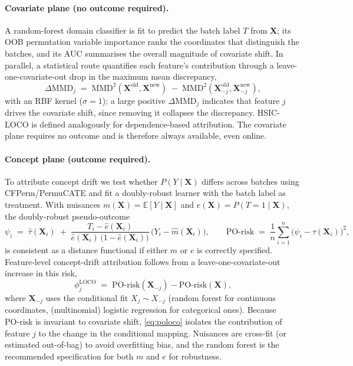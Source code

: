 \documentclass[11pt]{article}
\newcommand{\X}{\mathbf{X}}
\newcommand{\POrisk}{\mathrm{PO\text{-}risk}}
\newcommand{\MMD}{\mathrm{MMD}}
\newcommand{\Exp}{\mathbb{E}}
\begin{document}
\paragraph{Covariate plane (no outcome required).} A random-forest domain
classifier is fit to predict the batch label $T$ from $\X$; its OOB permutation
variable importance ranks the coordinates that distinguish the batches, and its
AUC summarises the overall magnitude of covariate shift. In parallel, a
statistical route quantifies each feature's contribution through a
leave-one-covariate-out drop in the maximum mean discrepancy,
\begin{equation}
  \Delta\MMD_j \;=\; \MMD^2(\X^{\mathrm{old}},\X^{\mathrm{new}})
  \;-\; \MMD^2(\X^{\mathrm{old}}_{-j},\X^{\mathrm{new}}_{-j}),
  \label{eq:mmdloco}
\end{equation}
with an RBF kernel ($\sigma=1$); a large positive $\Delta\MMD_j$ indicates that
feature $j$ drives the covariate shift, since removing it collapses the
discrepancy. HSIC-LOCO is defined analogously for dependence-based attribution.
The covariate plane requires no outcome and is therefore always available, even
online.

\paragraph{Concept plane (outcome required).} To attribute concept drift we test
whether $P(Y\mid\X)$ differs across batches using CFPerm/PermuCATE and fit a
doubly-robust learner with the batch label as treatment. With nuisances
$m(\X)=\Exp[Y\mid\X]$ and $e(\X)=P(T=1\mid\X)$, the doubly-robust pseudo-outcome
\begin{equation}
  \psi_i \;=\; \hat\tau(\X_i)
  \;+\; \frac{T_i-\hat e(\X_i)}{\hat e(\X_i)\,\bigl(1-\hat e(\X_i)\bigr)}\,
  \bigl(Y_i-\hat m(\X_i)\bigr),
  \qquad
  \POrisk \;=\; \frac{1}{n}\sum_{i=1}^{n}\bigl(\psi_i-\hat\tau(\X_i)\bigr)^2,
  \label{eq:porisk}
\end{equation}
is consistent as a distance functional if either $m$ or $e$ is correctly
specified. Feature-level concept-drift attribution follows from a
leave-one-covariate-out increase in this risk,
\begin{equation}
  \phi_j^{\mathrm{LOCO}} \;=\; \POrisk(\X_{-j}) - \POrisk(\X),
  \label{eq:poloco}
\end{equation}
where $\X_{-j}$ uses the conditional fit $X_j\sim X_{-j}$ (random forest for
continuous coordinates, (multinomial) logistic regression for categorical ones).
Because $\POrisk$ is invariant to covariate shift, \eqref{eq:poloco} isolates the
contribution of feature $j$ to the change in the conditional mapping. Nuisances
are cross-fit (or estimated out-of-bag) to avoid overfitting bias, and the
random forest is the recommended specification for both $m$ and $e$ for
robustness.
\end{document}
